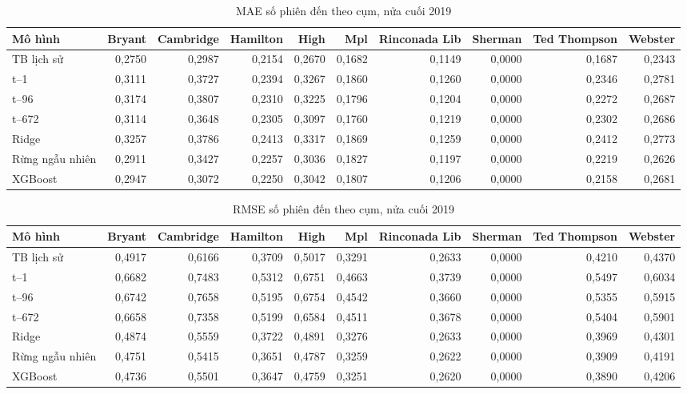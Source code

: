 \documentclass[conference,a4paper]{IEEEtran}
\begin{document}
\begin{table}[!t]
\caption{MAE số phiên đến theo cụm, nửa cuối 2019}
\label{tab:test_session_arrivals_MAE}
\centering\footnotesize
\setlength{\tabcolsep}{3pt}
\begin{tabularx}{\textwidth}{@{}Xrrrrrrrrr@{}}
\toprule
\textbf{Mô hình} & \textbf{Bryant} & \textbf{Cambridge} & \textbf{Hamilton} & \textbf{High} & \textbf{Mpl} & \textbf{Rinconada Lib} & \textbf{Sherman} & \textbf{Ted Thompson} & \textbf{Webster} \\
\midrule
TB lịch sử & 0,2750 & 0,2987 & 0,2154 & 0,2670 & 0,1682 & 0,1149 & 0,0000 & 0,1687 & 0,2343 \\
t–1 & 0,3111 & 0,3727 & 0,2394 & 0,3267 & 0,1860 & 0,1260 & 0,0000 & 0,2346 & 0,2781 \\
t–96 & 0,3174 & 0,3807 & 0,2310 & 0,3225 & 0,1796 & 0,1204 & 0,0000 & 0,2272 & 0,2687 \\
t–672 & 0,3114 & 0,3648 & 0,2305 & 0,3097 & 0,1760 & 0,1219 & 0,0000 & 0,2302 & 0,2686 \\
Ridge & 0,3257 & 0,3786 & 0,2413 & 0,3317 & 0,1869 & 0,1259 & 0,0000 & 0,2412 & 0,2773 \\
Rừng ngẫu nhiên & 0,2911 & 0,3427 & 0,2257 & 0,3036 & 0,1827 & 0,1197 & 0,0000 & 0,2219 & 0,2626 \\
XGBoost & 0,2947 & 0,3072 & 0,2250 & 0,3042 & 0,1807 & 0,1206 & 0,0000 & 0,2158 & 0,2681 \\
\bottomrule
\end{tabularx}
\end{table}

\begin{table}[!t]
\caption{RMSE số phiên đến theo cụm, nửa cuối 2019}
\label{tab:test_session_arrivals_RMSE}
\centering\footnotesize
\setlength{\tabcolsep}{3pt}
\begin{tabularx}{\textwidth}{@{}Xrrrrrrrrr@{}}
\toprule
\textbf{Mô hình} & \textbf{Bryant} & \textbf{Cambridge} & \textbf{Hamilton} & \textbf{High} & \textbf{Mpl} & \textbf{Rinconada Lib} & \textbf{Sherman} & \textbf{Ted Thompson} & \textbf{Webster} \\
\midrule
TB lịch sử & 0,4917 & 0,6166 & 0,3709 & 0,5017 & 0,3291 & 0,2633 & 0,0000 & 0,4210 & 0,4370 \\
t–1 & 0,6682 & 0,7483 & 0,5312 & 0,6751 & 0,4663 & 0,3739 & 0,0000 & 0,5497 & 0,6034 \\
t–96 & 0,6742 & 0,7658 & 0,5195 & 0,6754 & 0,4542 & 0,3660 & 0,0000 & 0,5355 & 0,5915 \\
t–672 & 0,6658 & 0,7358 & 0,5199 & 0,6584 & 0,4511 & 0,3678 & 0,0000 & 0,5404 & 0,5901 \\
Ridge & 0,4874 & 0,5559 & 0,3722 & 0,4891 & 0,3276 & 0,2633 & 0,0000 & 0,3969 & 0,4301 \\
Rừng ngẫu nhiên & 0,4751 & 0,5415 & 0,3651 & 0,4787 & 0,3259 & 0,2622 & 0,0000 & 0,3909 & 0,4191 \\
XGBoost & 0,4736 & 0,5501 & 0,3647 & 0,4759 & 0,3251 & 0,2620 & 0,0000 & 0,3890 & 0,4206 \\
\bottomrule
\end{tabularx}
\end{table}
\end{document}
